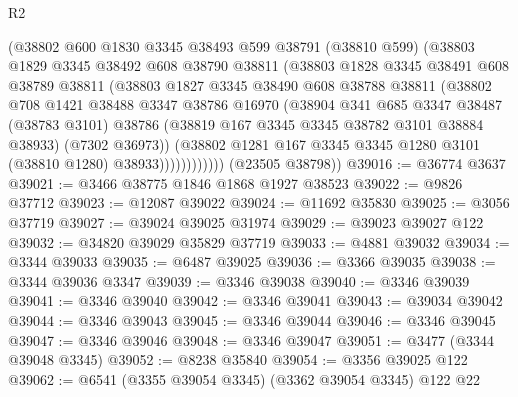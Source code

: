 \begin{lexlean}{R2}
\begin{coremodule}
                  (@38802
                    @600
                    @1830
                    @3345
                    @38493
                    @599
                    @38791
                    (@38810 @599)
                    (@38803
                      @1829
                      @3345
                      @38492
                      @608
                      @38790
                      @38811
                      (@38803
                        @1828
                        @3345
                        @38491
                        @608
                        @38789
                        @38811
                        (@38803
                          @1827
                          @3345
                          @38490
                          @608
                          @38788
                          @38811
                          (@38802
                            @708
                            @1421
                            @38488
                            @3347
                            @38786
                            @16970
                            (@38904
                              @341
                              @685
                              @3347
                              @38487
                              (@38783 @3101)
                              @38786
                              (@38819 @167 @3345 @3345 @38782 @3101 @38884 @38933)
                              (@7302 @36973))
                            (@38802
                              @1281
                              @167
                              @3345
                              @3345
                              @1280
                              @3101
                              (@38810 @1280)
                              @38933))))))))))))
      (@23505 @38798))
@39016 := @36774 @3637
@39021 := @3466 @38775 @1846 @1868 @1927 @38523
@39022 := @9826 @37712
@39023 := @12087 @39022
@39024 := @11692 @35830
@39025 := @3056 @37719
@39027 := @39024 @39025 @31974
@39029 := @39023 @39027 @122
@39032 := @34820 @39029 @35829 @37719
@39033 := @4881 @39032
@39034 := @3344 @39033
@39035 := @6487 @39025
@39036 := @3366 @39035
@39038 := @3344 @39036 @3347
@39039 := @3346 @39038
@39040 := @3346 @39039
@39041 := @3346 @39040
@39042 := @3346 @39041
@39043 := @39034 @39042
@39044 := @3346 @39043
@39045 := @3346 @39044
@39046 := @3346 @39045
@39047 := @3346 @39046
@39048 := @3346 @39047
@39051 := @3477 (@3344 @39048 @3345)
@39052 := @8238 @35840
@39054 := @3356 @39025 @122
@39062 := @6541 (@3355 @39054 @3345) (@3362 @39054 @3345) @122 @22

\end{coremodule}
\end{lexlean}
